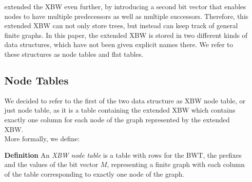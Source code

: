 \documentclass[a4paper,12pt,twoside,BCOR=10mm]{scrbook}
\begin{document}
\citet{Siren2014} extended the XBW even further, by introducing a second bit vector that enables nodes
to have multiple predecessors as well as multiple successors. Therefore, this extended XBW can not only
store trees, but instead can keep track of general finite graphs.
In this paper, the extended XBW is stored in two different kinds of data structures,
which have not been given explicit names there. We refer to these structures as
node tables and flat tables.

\subsection{Node Tables}
\label{sec:node_table_definition}

We decided to refer to the first of the two data structure as XBW node table, or just node table,
as it is a
table containing the extended XBW which contains exactly one column for each
node of the graph represented by the extended XBW. \\
More formally, we define:

\textbf{Definition} An \textit{XBW node table}\label{def:node_table} is a table with rows for the BWT,
the prefixes and the values of the bit vector $ M $,
representing a finite graph with each column of the table corresponding
to exactly one node of the graph.
\end{document}
